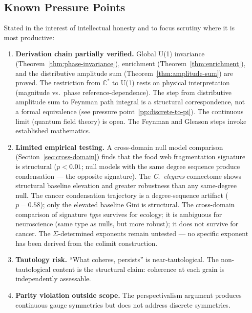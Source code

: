 \documentclass[12pt,a4paper]{article}
\begin{document}
\subsection{Known Pressure Points}
\label{sec:pressure-points}

Stated in the interest of intellectual honesty and to focus scrutiny where it is most productive:

\begin{enumerate}
  \item \label{pp:derivation-chain} \textbf{Derivation chain partially verified.} Global U(1) invariance (Theorem~\ref{thm:phase-invariance}), enrichment (Theorem~\ref{thm:enrichment}), and the distributive amplitude sum (Theorem~\ref{thm:amplitude-sum}) are proved. The restriction from $\mathbb{C}^*$ to U(1) rests on physical interpretation (magnitude vs.\ phase reference-dependence). The step from distributive amplitude sum to Feynman path integral is a structural correspondence, not a formal equivalence (see pressure point~\ref{pp:discrete-to-pi}). The continuous limit (quantum field theory) is open. The Feynman and Gleason steps invoke established mathematics.

  \item \label{pp:limited-empirical} \textbf{Limited empirical testing.} A cross-domain null model comparison (Section~\ref{sec:cross-domain}) finds that the food web fragmentation signature is structural ($p < 0.01$; null models with the same degree sequence produce condensation --- the opposite signature). The \textit{C.~elegans} connectome shows structural baseline elevation and greater robustness than any same-degree null. The cancer condensation trajectory is a degree-sequence artifact ($p = 0.58$); only the elevated baseline Gini is structural. The cross-domain comparison of signature \emph{type} survives for ecology; it is ambiguous for neuroscience (same type as nulls, but more robust); it does not survive for cancer. The $\Sigma$-determined exponents remain untested --- no specific exponent has been derived from the colimit construction.

  \item \label{pp:tautology} \textbf{Tautology risk.} ``What coheres, persists'' is near-tautological. The non-tautological content is the structural claim: coherence at each grain is independently assessable.

  \item \label{pp:parity} \textbf{Parity violation outside scope.} The perspectivalism argument produces continuous gauge symmetries but does not address discrete symmetries.


\end{enumerate}
\end{document}
